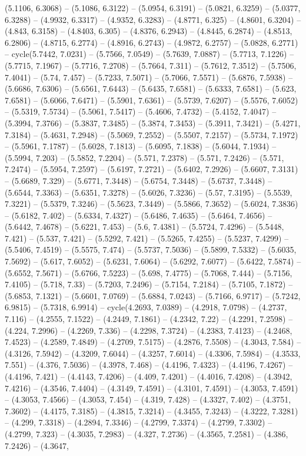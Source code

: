 (5.1106, 6.3068) -- (5.1086, 6.3122) -- (5.0954, 6.3191) -- (5.0821, 6.3259) -- (5.0377, 6.3288) -- (4.9932, 6.3317) -- (4.9352, 6.3283) -- (4.8771, 6.325) -- (4.8601, 6.3204) -- (4.843, 6.3158) -- (4.8403, 6.305) -- (4.8376, 6.2943) -- (4.8445, 6.2874) -- (4.8513, 6.2806) -- (4.8715, 6.2774) -- (4.8916, 6.2743) -- (4.9872, 6.2757) -- (5.0828, 6.2771) -- cycle(5.7442, 7.0231) -- (5.7566, 7.0549) -- (5.7639, 7.0887) -- (5.7713, 7.1226) -- (5.7715, 7.1967) -- (5.7716, 7.2708) -- (5.7664, 7.311) -- (5.7612, 7.3512) -- (5.7506, 7.4041) -- (5.74, 7.457) -- (5.7233, 7.5071) -- (5.7066, 7.5571) -- (5.6876, 7.5938) -- (5.6686, 7.6306) -- (5.6561, 7.6443) -- (5.6435, 7.6581) -- (5.6333, 7.6581) -- (5.623, 7.6581) -- (5.6066, 7.6471) -- (5.5901, 7.6361) -- (5.5739, 7.6207) -- (5.5576, 7.6052) -- (5.5319, 7.5734) -- (5.5061, 7.5417) -- (5.4606, 7.4732) -- (5.4152, 7.4047) -- (5.3994, 7.3766) -- (5.3837, 7.3485) -- (5.3874, 7.3453) -- (5.3911, 7.3421) -- (5.4271, 7.3184) -- (5.4631, 7.2948) -- (5.5069, 7.2552) -- (5.5507, 7.2157) -- (5.5734, 7.1972) -- (5.5961, 7.1787) -- (5.6028, 7.1813) -- (5.6095, 7.1838) -- (5.6044, 7.1934) -- (5.5994, 7.203) -- (5.5852, 7.2204) -- (5.571, 7.2378) -- (5.571, 7.2426) -- (5.571, 7.2474) -- (5.5954, 7.2597) -- (5.6197, 7.2721) -- (5.6402, 7.2926) -- (5.6607, 7.3131) -- (5.6689, 7.329) -- (5.6771, 7.3448) -- (5.6754, 7.3448) -- (5.6737, 7.3448) -- (5.6544, 7.3363) -- (5.6351, 7.3278) -- (5.6026, 7.3236) -- (5.57, 7.3195) -- (5.5539, 7.3221) -- (5.5379, 7.3246) -- (5.5623, 7.3449) -- (5.5866, 7.3652) -- (5.6024, 7.3836) -- (5.6182, 7.402) -- (5.6334, 7.4327) -- (5.6486, 7.4635) -- (5.6464, 7.4656) -- (5.6442, 7.4678) -- (5.6221, 7.453) -- (5.6, 7.4381) -- (5.5724, 7.4296) -- (5.5448, 7.421) -- (5.537, 7.421) -- (5.5292, 7.421) -- (5.5265, 7.4255) -- (5.5237, 7.4299) -- (5.5406, 7.4519) -- (5.5575, 7.474) -- (5.5737, 7.5036) -- (5.5899, 7.5332) -- (5.6035, 7.5692) -- (5.617, 7.6052) -- (5.6231, 7.6064) -- (5.6292, 7.6077) -- (5.6422, 7.5874) -- (5.6552, 7.5671) -- (5.6766, 7.5223) -- (5.698, 7.4775) -- (5.7068, 7.444) -- (5.7156, 7.4105) -- (5.718, 7.33) -- (5.7203, 7.2496) -- (5.7154, 7.2184) -- (5.7105, 7.1872) -- (5.6853, 7.1321) -- (5.6601, 7.0769) -- (5.6884, 7.0243) -- (5.7166, 6.9717) -- (5.7242, 6.9815) -- (5.7318, 6.9914) -- cycle(4.2693, 7.0389) -- (4.2918, 7.0798) -- (4.2737, 7.116) -- (4.2555, 7.1522) -- (4.2449, 7.1861) -- (4.2342, 7.22) -- (4.2291, 7.2598) -- (4.224, 7.2996) -- (4.2269, 7.336) -- (4.2298, 7.3724) -- (4.2383, 7.4123) -- (4.2468, 7.4523) -- (4.2589, 7.4849) -- (4.2709, 7.5175) -- (4.2876, 7.5508) -- (4.3043, 7.584) -- (4.3126, 7.5942) -- (4.3209, 7.6044) -- (4.3257, 7.6014) -- (4.3306, 7.5984) -- (4.3533, 7.551) -- (4.376, 7.5036) -- (4.3978, 7.468) -- (4.4196, 7.4323) -- (4.4196, 7.4267) -- (4.4196, 7.421) -- (4.4143, 7.4206) -- (4.409, 7.4201) -- (4.4016, 7.4208) -- (4.3942, 7.4216) -- (4.3546, 7.4404) -- (4.3149, 7.4591) -- (4.3101, 7.4591) -- (4.3053, 7.4591) -- (4.3053, 7.4566) -- (4.3053, 7.454) -- (4.319, 7.428) -- (4.3327, 7.402) -- (4.3751, 7.3602) -- (4.4175, 7.3185) -- (4.3815, 7.3214) -- (4.3455, 7.3243) -- (4.3222, 7.3281) -- (4.299, 7.3318) -- (4.2894, 7.3346) -- (4.2799, 7.3374) -- (4.2799, 7.3302) -- (4.2799, 7.323) -- (4.3035, 7.2983) -- (4.327, 7.2736) -- (4.3565, 7.2581) -- (4.386, 7.2426) -- (4.3647, 